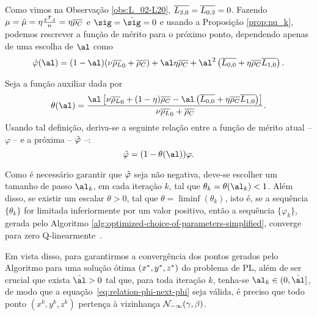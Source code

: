 Como vimos na Observação \ref{obs:L_02-L20},  $\overline{L_{2,0}} = \overline{L_{0,2}} = 0$. Fazendo $\mu = \hat{\mu} = \eta\frac{x^Tz}{n} = \eta\overline{\rho_C} $
 e $\sig = \nextsig=0$ e usando a Proposição \ref{prop:nu_k},   podemos rescrever a função de mérito para o próximo ponto, dependendo apenas de uma escolha de  $\al$ como
\begin{equation}
	\label{eq:simplified-merit-function-al}
\nextphi(\al)  = (1-\al)(\nu\dbvec{\rho_L}_0 +
\dbvec{\rho_C}) + \al\eta\dbvec{\rho_C} + \al^2\left(\dbvec{L_{0,0}} + \eta\dbvec{\rho_C} \dbvec{L_{1,0}}
\right) .
\end{equation}

Seja a função auxiliar  dada por
\begin{equation}
	\label{eq:theta}
\theta(\al) =  \dfrac{\al\left[ \nu\dbvec{\rho_L}_0 + (1-\eta)\dbvec{\rho_C} - \al\left(\dbvec{L_{0,0}} + \eta\dbvec{\rho_C} \dbvec{L_{1,0}}
\right) \right]}{\nu\dbvec{\rho_L}_0 +
\dbvec{\rho_C}}.
\end{equation}
Usando tal definição, deriva-se a seguinte relação entre a função de mérito atual -- $\varphi$ --  e a próxima -- $\hat{\varphi}$ --: 
\begin{equation}
	\label{eq:relation-phi-next-phi}
	 			{\nextphi} = (1- \theta(\al))\varphi.
\end{equation}


Como é necessário garantir que  $\hat{\varphi}  $  seja não negativa, deve-se escolher um tamanho de passo  $\al_k$, em cada iteração $k$, tal que  $\theta_k = \theta(\al_k)<1$. Além disso, se existir um escalar $\theta>0$, tal que $\theta = \liminf (\theta_k)$, isto é, se a sequência $\{\theta_k\}$ for limitada inferiormente por um valor positivo,	 então a sequência $\{\varphi_k\}$, gerada pelo Algoritmo \ref{alg:optimized-choice-of-parameters-simplified}, converge para zero Q-linearmente~\cite{Ortega:2000vd}.




 Em vista disso, para garantirmos a convergência dos pontos gerados pelo Algoritmo para uma solução ótima $(x^*,y^*,z^*)$ do problema de \ac{PL}, além de ser  crucial que exista $\hat{\al}>0$  tal que,  para toda iteração $k$, tenha-se  $\al_k\in(0,\hat{\al}]$, de modo que a equação~\eqref{eq:relation-phi-next-phi} seja válida, é preciso que todo   ponto  $({x}^{k} ,{y}^{k},{z}^{k})$ pertença à vizinhança $\mathcal{N}_{-\infty}(\gamma,\beta)$.

